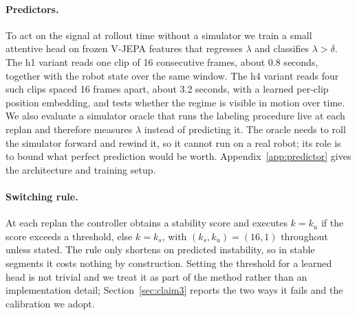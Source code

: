 \paragraph{Predictors.}
To act on the signal at rollout time without a simulator we train a small
attentive head on frozen V-JEPA features that regresses $\lambda$ and
classifies $\lambda > \delta$. The h1 variant reads one clip of 16 consecutive
frames, about 0.8 seconds, together with the robot state over the same window.
The h4 variant reads four such clips spaced 16 frames apart, about 3.2 seconds,
with a learned per-clip position embedding, and tests whether the regime is
visible in motion over time. We also evaluate a simulator oracle that runs the
labeling procedure live at each replan and therefore measures $\lambda$ instead
of predicting it. The oracle needs to roll the simulator forward and rewind it,
so it cannot run on a real robot; its role is to bound what perfect prediction
would be worth. Appendix~\ref{app:predictor} gives the architecture and
training setup.

\paragraph{Switching rule.}
At each replan the controller obtains a stability score and executes
$k = k_u$ if the score exceeds a threshold, else $k = k_s$, with
$(k_s, k_u) = (16, 1)$ throughout unless stated. The rule only shortens on
predicted instability, so in stable segments it costs nothing by construction.
Setting the threshold for a learned head is not trivial and we treat it as part
of the method rather than an implementation detail; Section~\ref{sec:claim3}
reports the two ways it fails and the calibration we adopt.

